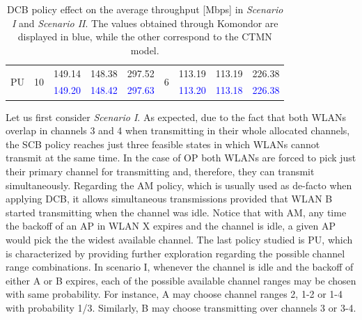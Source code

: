 \documentclass[a4paper]{article}
\begin{document}
\begin{table}[h]
\begin{tabular}{c|c|c|c|c|c|c|c|c|}
				\multicolumn{1}{|c|}{\multirow{2}{*}{PU}}  & \multirow{2}{*}{10} & 149.14     & 148.38     & 297.52   & \multirow{2}{*}{6} & 113.19     & 113.19     & 226.38   \\  
				\multicolumn{1}{|c|}{}                     &                     & \textcolor{blue}{149.20}     & \textcolor{blue}{148.42}     & \textcolor{blue}{297.63}   &                    & \textcolor{blue}{113.20}     & \textcolor{blue}{113.18}     & \textcolor{blue}{226.38}   \\ \hline
			\end{tabular}
		\caption{DCB policy effect on the average throughput [Mbps] in \textit{Scenario I} and \textit{Scenario II}. The values obtained through Komondor are displayed in blue, while the other correspond to the CTMN model.}
		\label{table:cb_policy_effect}
	\end{table}

	Let us first consider \textit{Scenario I}. As expected, due to the fact that both WLANs overlap in channels 3 and 4 when transmitting in their whole allocated channels, the SCB policy reaches just three feasible states in which WLANs cannot transmit at the same time. In the case of OP both WLANs are forced to pick just their primary channel for transmitting and, therefore, they can transmit simultaneously.	
	Regarding the AM policy, which is usually used as de-facto when applying DCB, it allows simultaneous transmissions provided that WLAN B started transmitting when the channel was idle. Notice that with AM, any time the backoff of an AP in WLAN X expires and the channel is idle, a given AP would pick the the widest available channel. 	
	The last policy studied is PU, which is characterized by providing further exploration regarding the possible channel range combinations. In scenario I, whenever the channel is idle and the backoff of either A or B expires, each of the possible available channel ranges may be chosen with same probability. For instance, A may choose channel ranges 2, 1-2 or 1-4 with probability 1/3. Similarly, B may choose transmitting over channels 3 or 3-4.
	
\end{document}
